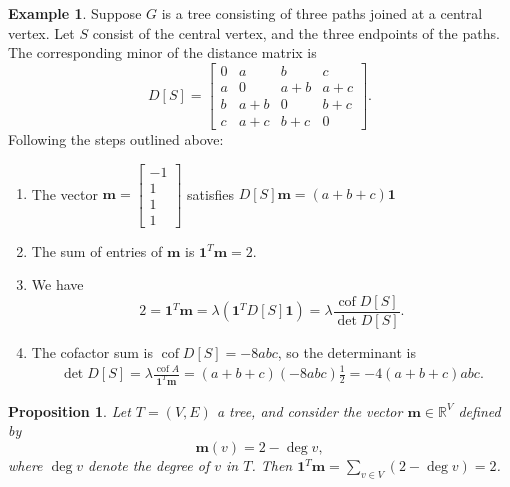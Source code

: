 \documentclass{amsart}
\newtheorem{prop}[thm]{Proposition}
\theoremstyle{definition}
\newtheorem{eg}[thm]{Example}
\newcommand{\RR}{\mathbb{R}}
\DeclareMathOperator{\cof}{cof}
\begin{document}
\begin{eg}
Suppose $G$ is a tree consisting of three paths joined at a central vertex.
Let $S$ consist of the central vertex, and the three endpoints of the paths. 
The corresponding minor of the distance matrix is
$$
D[S] = \begin{bmatrix}
0 & a & b & c \\
a & 0 & a + b & a + c \\
b & a + b & 0 & b + c \\
c & a + c & b + c & 0
\end{bmatrix}.
$$
Following the steps outlined above:
\begin{enumerate}
\item 
The vector $\mathbf{m} = \begin{bmatrix} -1 \\ 1 \\ 1 \\ 1 \end{bmatrix}$ satisfies
$
D[S] \mathbf{m} = (a+b+c) \mathbf{1}
$

\item 
The sum of entries of $\mathbf{m}$ is $\mathbf{1}^T \mathbf{m} = 2$.

\item 
We have 
$$2 = \mathbf{1}^T \mathbf{m} = \lambda (\mathbf{1}^T D[S] \mathbf{1}) = \displaystyle \lambda \frac{\cof D[S]}{\det D[S]}.$$

\item 
The cofactor sum is 
$\cof D[S] = -8 abc$,
so the determinant is
\begin{align*}
\det D[S] 
= \lambda \frac{\cof A}{\mathbf{1}^T \mathbf{m}}
= (a+b+c) (-8 abc)\frac{1}{2}
= -4(a+b+c)abc.
\end{align*}

\end{enumerate}
\end{eg}

\begin{prop}
Let $T = (V,E)$ a tree, and consider the vector $\mathbf{m} \in \RR^V$
defined by 
\begin{equation*}
\mathbf{m}(v) = 2 - \deg v,
\end{equation*}
where $\deg v$ denote the degree of $v$ in $T$.
Then $\mathbf{1}^T \mathbf{m} = \sum_{v \in V} (2-\deg v) = 2$.
\end{prop}
\end{document}
